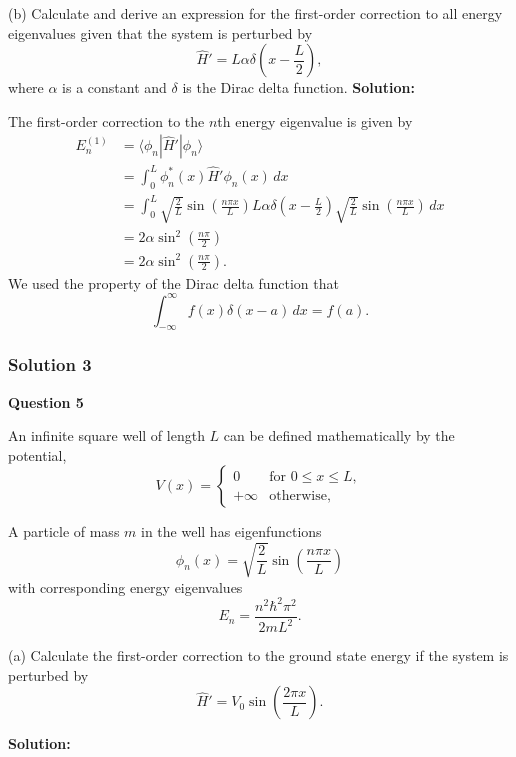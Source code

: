 \documentclass{article}
\begin{document}
(b) Calculate and derive an expression for the first-order correction to all energy eigenvalues given that the system is perturbed by
\[
\hat{H}' = L \alpha \delta\left(x - \frac{L}{2}\right),
\]
where $\alpha$ is a constant and $\delta$ is the Dirac delta function.
\textbf{Solution:}

The first-order correction to the $n$th energy eigenvalue is given by
\begin{align*}
E_n^{(1)} &= \langle \phi_n | \hat{H}' | \phi_n \rangle \\
&= \int_0^L \phi_n^*(x) \hat{H}' \phi_n(x) \, dx \\
&= \int_0^L \sqrt{\frac{2}{L}} \sin\left(\frac{n \pi x}{L}\right) L \alpha \delta\left(x - \frac{L}{2}\right) \sqrt{\frac{2}{L}} \sin\left(\frac{n \pi x}{L}\right) \, dx \\
&= 2 \alpha \sin^2\left(\frac{n \pi}{2}\right) \\
&= \boxed{2 \alpha \sin^2\left(\frac{n \pi}{2}\right)}.
\end{align*}
We used the property of the Dirac delta function that
\[
\int_{-\infty}^\infty f(x) \delta(x - a) \, dx = f(a).
\]

\subsubsection{Solution 3}
\textbf{Question 5}

An infinite square well of length $L$ can be defined mathematically by the potential,
\[
V(x) = \begin{cases} 0 & \text{for } 0 \leq x \leq L, \\ +\infty & \text{otherwise}, \end{cases}
\]

A particle of mass $m$ in the well has eigenfunctions
\[
\phi_n(x) = \sqrt{\frac{2}{L}} \sin\left(\frac{n \pi x}{L}\right)
\]
with corresponding energy eigenvalues
\[
E_n = \frac{n^2 \hbar^2 \pi^2}{2mL^2}.
\]

(a) Calculate the first-order correction to the ground state energy if the system is perturbed by
\[
\hat{H}' = V_0 \sin\left(\frac{2\pi x}{L}\right).
\]

\textbf{Solution:}
\end{document}
